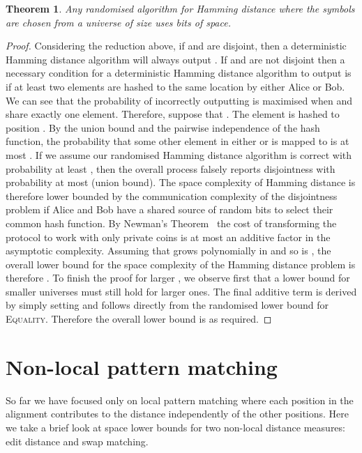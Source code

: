 \documentclass{article}
\newcommand{\equality}{\textsc{Equality}\xspace}
\theoremstyle{plain}
\newtheorem{theorem}{Theorem}[]
\theoremstyle{definition}
\begin{document}
\begin{theorem}
    Any randomised algorithm for Hamming distance where the symbols are chosen from a universe of size  uses  bits of space.
\end{theorem}
\begin{proof}
    Considering the reduction above, if  and  are disjoint, then a deterministic Hamming distance algorithm will always output . If  and  are not disjoint then a necessary condition for a deterministic Hamming distance algorithm to output  is if at least two elements are hashed to the same location by either Alice or Bob. We can see that the probability of incorrectly outputting  is maximised when  and  share exactly one element. Therefore, suppose that . The element  is hashed to position . By the union bound and the pairwise independence of the hash function, the probability that some other element in either  or  is mapped to  is at most . If we assume our randomised Hamming distance algorithm is correct with probability at least , then the overall process falsely reports disjointness with probability at most  (union bound).  The space complexity of Hamming distance is therefore lower bounded by the communication complexity of the disjointness problem if Alice and Bob have a shared source of random bits to select their common hash function. By Newman's Theorem~\cite{Newman:1991} the cost of transforming the protocol to work with only private coins is at most an additive  factor in the asymptotic complexity. Assuming that  grows polynomially in  and so  is , the overall lower bound for the space complexity of the Hamming distance problem is therefore .  To finish the proof for larger , we observe first that a lower bound for smaller universes must still hold for larger ones. The final additive  term is derived by simply setting  and follows directly from the randomised lower bound for \equality. Therefore the overall lower bound is  as required.
\end{proof}


\section{Non-local pattern matching} \label{sec:non-local}

So far we have focused only on local pattern matching where each position in the alignment contributes to the distance independently of the other positions. Here we take a brief look at space lower bounds for two non-local distance measures: edit distance and swap matching.
\end{document}
